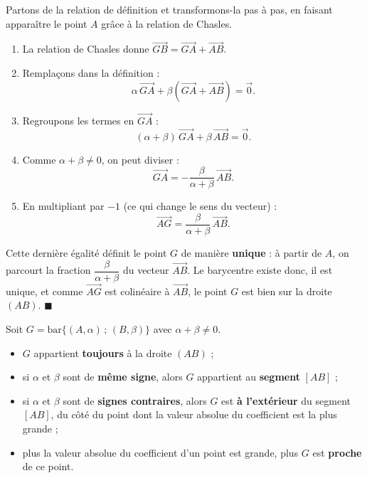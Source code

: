 \documentclass[11pt]{article}
\begin{document}
\begin{experience}
Partons de la relation de définition et transformons-la pas à pas, en faisant apparaître le point $A$ grâce à la relation de Chasles.
\begin{enumerate}
\item La relation de Chasles donne $\overrightarrow{GB} = \overrightarrow{GA} + \overrightarrow{AB}$.
\item Remplaçons dans la définition :
\[ \alpha\,\overrightarrow{GA} + \beta\left(\overrightarrow{GA} + \overrightarrow{AB}\right) = \vec{0}. \]
\item Regroupons les termes en $\overrightarrow{GA}$ :
\[ (\alpha + \beta)\,\overrightarrow{GA} + \beta\,\overrightarrow{AB} = \vec{0}. \]
\item Comme $\alpha + \beta \neq 0$, on peut diviser :
\[ \overrightarrow{GA} = -\frac{\beta}{\alpha + \beta}\,\overrightarrow{AB}. \]
\item En multipliant par $-1$ (ce qui change le sens du vecteur) :
\[ \overrightarrow{AG} = \frac{\beta}{\alpha + \beta}\,\overrightarrow{AB}. \]
\end{enumerate}
Cette dernière égalité définit le point $G$ de manière \textbf{unique} : à partir de $A$, on parcourt la fraction $\dfrac{\beta}{\alpha+\beta}$ du vecteur $\overrightarrow{AB}$. Le barycentre existe donc, il est unique, et comme $\overrightarrow{AG}$ est colinéaire à $\overrightarrow{AB}$, le point $G$ est bien sur la droite $(AB)$. \hfill $\blacksquare$
\end{experience}

\begin{propriete}
Soit $G = \mathrm{bar}\{(A, \alpha)\,;\,(B, \beta)\}$ avec $\alpha + \beta \neq 0$.
\begin{itemize}
\item $G$ appartient \textbf{toujours} à la droite $(AB)$ ;
\item si $\alpha$ et $\beta$ sont de \textbf{même signe}, alors $G$ appartient au \textbf{segment} $[AB]$ ;
\item si $\alpha$ et $\beta$ sont de \textbf{signes contraires}, alors $G$ est \textbf{à l'extérieur} du segment $[AB]$, du côté du point dont la valeur absolue du coefficient est la plus grande ;
\item plus la valeur absolue du coefficient d'un point est grande, plus $G$ est \textbf{proche} de ce point.
\end{itemize}
\end{propriete}
\end{document}
